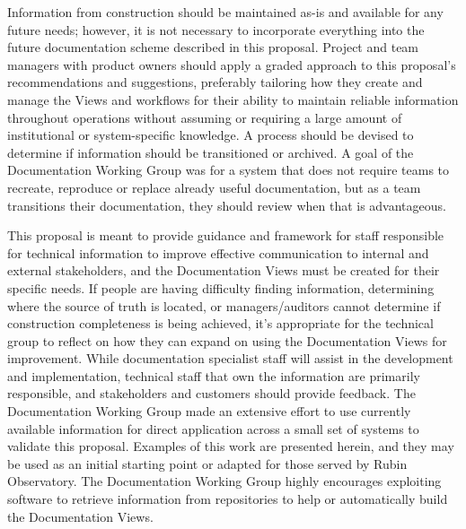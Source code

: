 Information from construction should be maintained as-is and available for any future needs; however, it is not necessary to incorporate everything into the future documentation scheme described in this proposal.
Project and team managers with product owners should apply a graded approach to this proposal's recommendations and suggestions, preferably tailoring how they create and manage the Views and workflows for their ability to maintain reliable information throughout operations without assuming or requiring a large amount of institutional or system-specific knowledge. 
A process should be devised to determine if information should be transitioned or archived.
A goal of the Documentation Working Group was for a system that does not require teams to recreate, reproduce or replace already useful documentation, but as a team transitions their documentation, they should review when that is advantageous.

This proposal is meant to provide guidance and framework for staff responsible for technical information to improve effective communication to internal and external stakeholders, and the Documentation Views must be created for their specific needs.
If people are having difficulty finding information, determining where the source of truth is located, or managers/auditors cannot determine if construction completeness is being achieved, it's appropriate for the technical group to reflect on how they can expand on using the Documentation Views for improvement.
While documentation specialist staff will assist in the development and implementation, technical staff that own the information are primarily responsible, and stakeholders and customers should provide feedback.
The Documentation Working Group made an extensive effort to use currently available information for direct application across a small set of systems to validate this proposal.
Examples of this work are presented herein, and they may be used as an initial starting point or adapted for those served by Rubin Observatory.
The Documentation Working Group highly encourages exploiting software to retrieve information from repositories to help or automatically build the Documentation Views.
